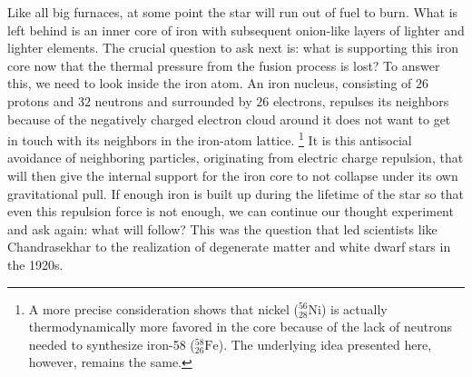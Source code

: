 Like all big furnaces, at some point the star will run out of fuel to burn.
What is left behind is an inner core of iron with subsequent onion-like layers of lighter and lighter elements.
The crucial question to ask next is: 
what is supporting this iron core now that the thermal pressure from the fusion process is lost?
To answer this, we need to look inside the iron atom.
An iron nucleus, consisting of $26$ protons and $32$ neutrons and surrounded by $26$ electrons, repulses its neighbors because of the negatively charged electron cloud around it does not want to get in touch with its neighbors in the iron-atom lattice.
\footnote{A more precise consideration shows that nickel ($^{56}_{28}\mathrm{Ni}$) is actually thermodynamically more favored in the core because of the lack of neutrons needed to synthesize iron-58 ($^{58}_{26}\mathrm{Fe}$).
The underlying idea presented here, however, remains the same.
}
It is this antisocial avoidance of neighboring particles, originating from electric charge repulsion, that will then give the internal support for the iron core to not collapse under its own gravitational pull.
If enough iron is built up during the lifetime of the star so that even this repulsion force is not enough, we can continue our thought experiment and ask again: what will follow?
This was the question that led scientists like Chandrasekhar to the realization of degenerate matter and white dwarf stars in the 1920s.

